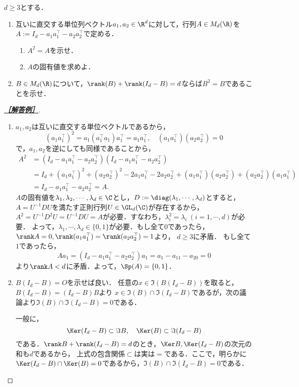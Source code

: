 \documentclass[uplatex,dvipdfmx]{jsarticle}
\begin{document}
\begin{tcolorbox}[colframe=ForestGreen, colback=ForestGreen!10!white,breakable,colbacktitle=ForestGreen!40!white,coltitle=black,fonttitle=\bfseries\sffamily,
    title=第２問]
    \begin{problem}\label{prob-19-8-2}
        $d\ge3$とする．
    \begin{enumerate}
        \item 互いに直交する単位列ベクトル$a_1,a_2\in\R^d$に対して，行列$A\in M_d(\R)$を$A:=I_d-a_1a_1^\top-a_2a_2^\top$で定める．
        \begin{enumerate}
            \item $A^2=A$を示せ．
            \item $A$の固有値を求めよ．
        \end{enumerate}
        \item $B\in M_d(\R)$について，$\rank(B)+\rank(I_d-B)=d$ならば$B^2=B$であることを示せ．
    \end{enumerate}
    \end{problem}
\end{tcolorbox}
\begin{proof}[\textbf{\underline{［解答例］}}]\mbox{}
    \begin{enumerate}
        \item $a_1,a_2$は互いに直交する単位ベクトルであるから，
        \[(a_1a_1^\top)^2=a_1(a_1^\top a_1)a_1^\top =a_1a_1^\top,\quad (a_1a_1^\top)(a_2a_2^\top)=0\]
        で，$a_1,a_2$を逆にしても同様であることから，
        \begin{align*}
            A^2&=(I_d-a_1a_1^\top-a_2a_2^\top)(I_d-a_1a_1^\top-a_2a_2^\top)\\
            &=I_d+(a_1a_1^\top)^2+(a_2a_2^\top)^2-2a_1a_1^\top-2a_2a_2^\top+(a_1a_1^\top)(a_2a_2^\top)+(a_2a_2^\top)(a_1a_1^\top)\\
            &=I_d-a_1a_1^\top-a_2a_2^\top=A.
        \end{align*}
        $A$の固有値を$\lambda_1,\lambda_2,\cdots,\lambda_d\in\C$とし，$D:=\diag(\lambda_1,\cdots,\lambda_d)$とすると，$A=U^{-1}DU$を満たす正則行列$U\in\GL_d(\C)$が存在するから，$A^2=U^{-1}D^2U=U^{-1}DU=A$が必要．すなわち，$\lambda_i^2=\lambda_i\;(i=1,\cdots,d)$が必要．
        よって，$\lambda_1,\cdots,\lambda_d\in\{0,1\}$が必要．もし全て$0$であったら，
        $\rank A=0,\rank(a_1a_1^\top)=\rank(a_2a_2^\top)=1$より，
        $d\ge3$に矛盾．
        もし全て$1$であったら，
        \[Aa_1=(I_d-a_1a_1^\top-a_2a_2^\top)a_1=a_1-a_11-a_20=0\]
        より$\rank A<d$に矛盾．よって，$\Sp(A)=\{0,1\}$．
        \item $B(I_d-B)=O$を示せば良い．
        任意の$x\in\Im(B(I_d-B))$を取ると，$B(I_d-B)=(I_d-B)B$より
        $x\in\Im(B)\cap\Im(I_d-B)$であるが，次の議論より$\Im(B)\cap\Im(I_d-B)=0$である．

        一般に，\[\Ker(I_d-B)\subset\Im B,\quad\Ker(B)\subset\Im(I_d-B)\]である．$\rank B+\rank(I_d-B)=d$のとき，$\Ker B,\Ker(I_d-B)$の次元の和も$d$であるから，
        上式の包含関係$\subset$は実は$=$である．ここで，明らかに$\Ker(I_d-B)\cap\Ker(B)=0$であるから，$\Im(B)\cap\Im(I_d-B)=0$である．
    \end{enumerate}
\end{proof}
\end{document}
